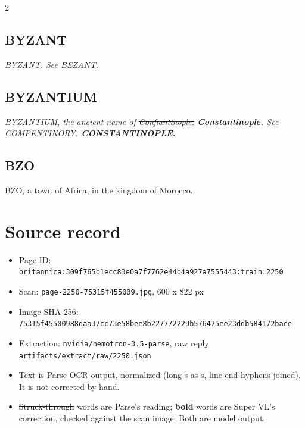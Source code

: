\documentclass[10pt]{article}
\begin{document}
\begin{multicols}{2}
\subsection*{BYZANT}
\textit{BYZANT. See BEZANT.}

\subsection*{BYZANTIUM}
\textit{BYZANTIUM, the ancient name of \sout{Confiantinople.} \textbf{Constantinople.} See \sout{COMPENTINORY.} \textbf{CONSTANTINOPLE.}}

\subsection*{BZO}
BZO, a town of Africa, in the kingdom of Morocco.
\end{multicols}
\section*{Source record}
\begin{itemize}
\item Page ID: \texttt{britannica:309f765b1ecc83e0a7f7762e44b4a927a7555443:train:2250}
\item Scan: \texttt{page-2250-75315f455009.jpg}, 600 x 822 px
\item Image SHA-256: \texttt{\small 75315f45500988daa37cc73e58bee8b227772229b576475ee23ddb584172baee}
\item Extraction: \texttt{nvidia/nemotron-3.5-parse}, raw reply \texttt{artifacts/extract/raw/2250.json}
\item Text is Parse OCR output, normalized (long s as s, line-end hyphens joined). It is not corrected by hand.
\item \sout{Struck-through} words are Parse's reading; \textbf{bold} words are Super VL's correction, checked against the scan image. Both are model output.
\end{itemize}
\end{document}
